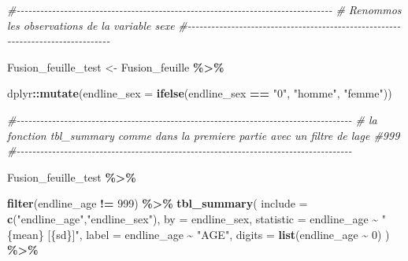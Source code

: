 \documentclass[
]{article}
\newenvironment{Shaded}{\begin{snugshade}}{\end{snugshade}}
\newcommand{\AttributeTok}[1]{\textcolor[rgb]{0.13,0.29,0.53}{#1}}
\newcommand{\CommentTok}[1]{\textcolor[rgb]{0.56,0.35,0.01}{\textit{#1}}}
\newcommand{\DecValTok}[1]{\textcolor[rgb]{0.00,0.00,0.81}{#1}}
\newcommand{\FunctionTok}[1]{\textcolor[rgb]{0.13,0.29,0.53}{\textbf{#1}}}
\newcommand{\NormalTok}[1]{#1}
\newcommand{\OtherTok}[1]{\textcolor[rgb]{0.56,0.35,0.01}{#1}}
\newcommand{\SpecialCharTok}[1]{\textcolor[rgb]{0.81,0.36,0.00}{\textbf{#1}}}
\newcommand{\StringTok}[1]{\textcolor[rgb]{0.31,0.60,0.02}{#1}}
\begin{document}
\begin{Shaded}
\begin{Highlighting}[]
\CommentTok{\#{-}{-}{-}{-}{-}{-}{-}{-}{-}{-}{-}{-}{-}{-}{-}{-}{-}{-}{-}{-}{-}{-}{-}{-}{-}{-}{-}{-}{-}{-}{-}{-}{-}{-}{-}{-}{-}{-}{-}{-}{-}{-}{-}{-}{-}{-}{-}{-}{-}{-}{-}{-}{-}{-}{-}{-}{-}{-}{-}{-}{-}{-}{-}{-}{-}{-}{-}{-}{-}{-}{-}{-}{-}{-}{-}{-}{-}{-}{-}{-}}
\CommentTok{\#  Renommos les observations de la variable sexe}
\CommentTok{\#{-}{-}{-}{-}{-}{-}{-}{-}{-}{-}{-}{-}{-}{-}{-}{-}{-}{-}{-}{-}{-}{-}{-}{-}{-}{-}{-}{-}{-}{-}{-}{-}{-}{-}{-}{-}{-}{-}{-}{-}{-}{-}{-}{-}{-}{-}{-}{-}{-}{-}{-}{-}{-}{-}{-}{-}{-}{-}{-}{-}{-}{-}{-}{-}{-}{-}{-}{-}{-}{-}{-}{-}{-}{-}{-}{-}{-}{-}{-}{-}}

\NormalTok{Fusion\_feuille\_test }\OtherTok{\textless{}{-}}\NormalTok{ Fusion\_feuille }\SpecialCharTok{\%\textgreater{}\%}
  
\NormalTok{dplyr}\SpecialCharTok{::}\FunctionTok{mutate}\NormalTok{(}\AttributeTok{endline\_sex =} \FunctionTok{ifelse}\NormalTok{(endline\_sex }\SpecialCharTok{==} \StringTok{"0"}\NormalTok{, }\StringTok{"homme"}\NormalTok{, }\StringTok{"femme"}\NormalTok{))}


\CommentTok{\#{-}{-}{-}{-}{-}{-}{-}{-}{-}{-}{-}{-}{-}{-}{-}{-}{-}{-}{-}{-}{-}{-}{-}{-}{-}{-}{-}{-}{-}{-}{-}{-}{-}{-}{-}{-}{-}{-}{-}{-}{-}{-}{-}{-}{-}{-}{-}{-}{-}{-}{-}{-}{-}{-}{-}{-}{-}{-}{-}{-}{-}{-}{-}{-}{-}{-}{-}{-}{-}{-}{-}{-}{-}{-}{-}{-}{-}{-}{-}{-}{-}{-}{-}{-}{-}}
\CommentTok{\# la fonction tbl\_summary comme dans la premiere partie avec un filtre de l\textquotesingle{}age \#999}
\CommentTok{\#{-}{-}{-}{-}{-}{-}{-}{-}{-}{-}{-}{-}{-}{-}{-}{-}{-}{-}{-}{-}{-}{-}{-}{-}{-}{-}{-}{-}{-}{-}{-}{-}{-}{-}{-}{-}{-}{-}{-}{-}{-}{-}{-}{-}{-}{-}{-}{-}{-}{-}{-}{-}{-}{-}{-}{-}{-}{-}{-}{-}{-}{-}{-}{-}{-}{-}{-}{-}{-}{-}{-}{-}{-}{-}{-}{-}{-}{-}{-}{-}{-}{-}{-}{-}{-}}

\NormalTok{Fusion\_feuille\_test }\SpecialCharTok{\%\textgreater{}\%}
  
\FunctionTok{filter}\NormalTok{(endline\_age }\SpecialCharTok{!=} \DecValTok{999}\NormalTok{) }\SpecialCharTok{\%\textgreater{}\%}
\FunctionTok{tbl\_summary}\NormalTok{(}
\AttributeTok{include =} \FunctionTok{c}\NormalTok{(}\StringTok{"endline\_age"}\NormalTok{,}\StringTok{"endline\_sex"}\NormalTok{),}
\AttributeTok{by =}\NormalTok{ endline\_sex,}
\AttributeTok{statistic =}\NormalTok{ endline\_age }\SpecialCharTok{\textasciitilde{}} \StringTok{" \{mean\} [\{sd\}]"}\NormalTok{,}
\AttributeTok{label =}\NormalTok{ endline\_age }\SpecialCharTok{\textasciitilde{}} \StringTok{"AGE"}\NormalTok{,}
\AttributeTok{digits =} \FunctionTok{list}\NormalTok{(endline\_age }\SpecialCharTok{\textasciitilde{}} \DecValTok{0}\NormalTok{)}
\NormalTok{) }\SpecialCharTok{\%\textgreater{}\%}
  

\end{Highlighting}
\end{Shaded}
\end{document}
